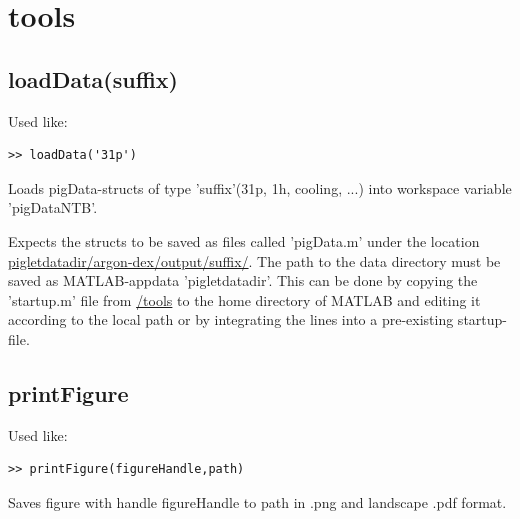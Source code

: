 \documentclass[10pt, a4paper]{article}
\begin{document}
\section{tools}
\subsection*{loadData(suffix)}
Used like:

\begin{lstlisting}
>> loadData('31p')
\end{lstlisting}

Loads pigData-structs of type 'suffix'(31p, 1h, cooling, ...) into workspace variable 'pigDataNTB'. 

Expects the structs to be saved as files called 'pigData.m' under the location \url{pigletdatadir/argon-dex/output/suffix/}. The path to the data directory must be saved as MATLAB-appdata 'pigletdatadir'. This can be done by copying the 'startup.m' file from \url{/tools} to the home directory of MATLAB and editing it according to the local path or by integrating the lines into a pre-existing startup-file. 

\subsection*{printFigure}
Used like:
\begin{lstlisting}
>> printFigure(figureHandle,path)
\end{lstlisting}
Saves figure with handle figureHandle to path in .png and landscape .pdf format.
\end{document}
